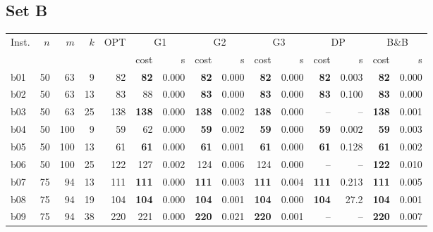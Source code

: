 \subsection*{Set B}
\begingroup\footnotesize\setlength{\tabcolsep}{2.6pt}\setlength{\LTpre}{2pt}
\begin{longtable}{@{}lrrrr@{\hspace{9pt}}rr@{\hspace{9pt}}rr@{\hspace{9pt}}rr@{\hspace{9pt}}rr@{\hspace{9pt}}rr@{}}\toprule
Inst. & \(n\) & \(m\) & \(k\) & OPT & \multicolumn{2}{c}{G1} & \multicolumn{2}{c}{G2} & \multicolumn{2}{c}{G3} & \multicolumn{2}{c}{DP} & \multicolumn{2}{c}{B\&B}\\
\cmidrule(l{6pt}){6-7}\cmidrule(l{6pt}){8-9}\cmidrule(l{6pt}){10-11}\cmidrule(l{6pt}){12-13}\cmidrule(l{6pt}){14-15}
 & & & & & cost & s & cost & s & cost & s & cost & s & cost & s\\\midrule\endhead
b01 & 50 & 63 & 9 & 82 & \textbf{82} & 0.000 & \textbf{82} & 0.000 & \textbf{82} & 0.000 & \textbf{82} & 0.003 & \textbf{82} & 0.000\\
b02 & 50 & 63 & 13 & 83 & 88 & 0.000 & \textbf{83} & 0.000 & \textbf{83} & 0.000 & \textbf{83} & 0.100 & \textbf{83} & 0.000\\
b03 & 50 & 63 & 25 & 138 & \textbf{138} & 0.000 & \textbf{138} & 0.002 & \textbf{138} & 0.000 & -- & -- & \textbf{138} & 0.001\\
b04 & 50 & 100 & 9 & 59 & 62 & 0.000 & \textbf{59} & 0.002 & \textbf{59} & 0.000 & \textbf{59} & 0.002 & \textbf{59} & 0.003\\
b05 & 50 & 100 & 13 & 61 & \textbf{61} & 0.000 & \textbf{61} & 0.001 & \textbf{61} & 0.000 & \textbf{61} & 0.128 & \textbf{61} & 0.002\\
b06 & 50 & 100 & 25 & 122 & 127 & 0.002 & 124 & 0.006 & 124 & 0.000 & -- & -- & \textbf{122} & 0.010\\
b07 & 75 & 94 & 13 & 111 & \textbf{111} & 0.000 & \textbf{111} & 0.003 & \textbf{111} & 0.004 & \textbf{111} & 0.213 & \textbf{111} & 0.005\\
b08 & 75 & 94 & 19 & 104 & \textbf{104} & 0.000 & \textbf{104} & 0.001 & \textbf{104} & 0.000 & \textbf{104} & 27.2 & \textbf{104} & 0.001\\
b09 & 75 & 94 & 38 & 220 & 221 & 0.000 & \textbf{220} & 0.021 & \textbf{220} & 0.001 & -- & -- & \textbf{220} & 0.007\\

\end{longtable}
